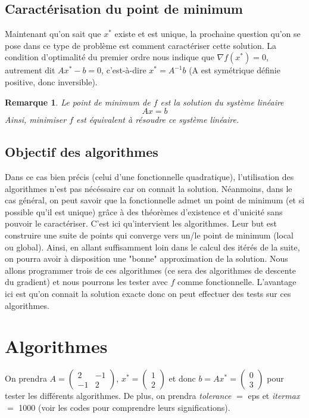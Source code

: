 \documentclass[9pt,a4paper]{article}
\newtheorem{rem}{Remarque}
\begin{document}
\subsection{Caractérisation du point de minimum}
Maintenant qu'on sait que $x^*$ existe et est unique, la prochaine question qu'on se pose dans ce type de problème est comment caractériser cette solution.\newline
La condition d'optimalité du premier ordre nous indique que $\nabla f(x^*) = 0$, autrement dit $Ax^* - b = 0$, c'est-à-dire $x^* = A^{-1}b$ (A est symétrique définie positive, donc inversible).\newline
\begin{tcolorbox}[colback = green!10!white]
    \begin{rem}
    Le point de minimum de $f$ est la solution du système linéaire
    $$
    Ax = b
    $$
    Ainsi, minimiser $f$ est équivalent à résoudre ce système linéaire.
    \end{rem}
\end{tcolorbox}
\subsection{Objectif des algorithmes}
Dans ce cas bien précis (celui d'une fonctionnelle quadratique), l'utilisation des algorithmes n'est pas nécéssaire car on connait la solution. Néanmoins, dans le cas général, on peut savoir que la fonctionnelle admet un point de minimum (et si possible qu'il est unique) grâce à des théorèmes d'existence et d'unicité sans pouvoir le caractériser. C'est ici qu'intervient les algorithmes. Leur but est construire une suite de points qui converge vers un/le point de minimum (local ou global). Ainsi, en allant suffisamment loin dans le calcul des itérés de la suite, on pourra avoir à disposition une "bonne" approximation de la solution.\newline
Nous allons programmer trois de ces algorithmes (ce sera des algorithmes de descente du gradient) et nous pourrons les tester avec $f$ comme fonctionnelle. L'avantage ici est qu'on connait la solution exacte donc on peut effectuer des tests sur ces algorithmes.
\section{Algorithmes}
On prendra $A =
\begin{pmatrix}
    2 & -1\\
    -1 & 2
\end{pmatrix}$, $x^* =
\begin{pmatrix}
    1\\
    2
\end{pmatrix}$ et donc $b = Ax^* = 
\begin{pmatrix}
    0\\
    3
\end{pmatrix}$ pour tester les différents algorithmes.\newline
De plus, on prendra \textit{tolerance} $=$ eps et \textit{itermax} $=$ 1000 (voir les codes pour comprendre leurs significations).
\end{document}

